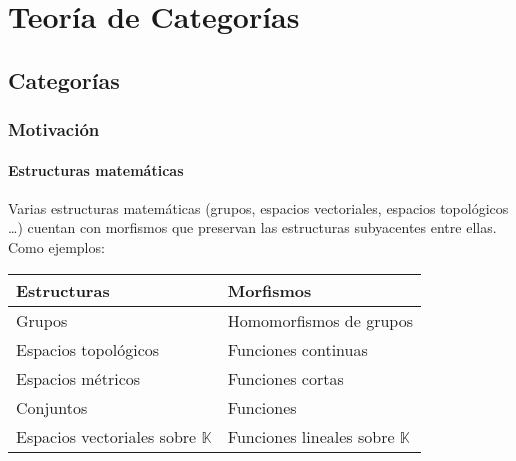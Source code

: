 \documentclass[11pt, fleqn, spanish]{book}
\begin{document}

\pagestyle{empty} %
\tableofcontents %
\cleardoublepage %
\pagestyle{fancy} %


\part{Teoría de Categorías}



\chapter{Categorías}

\section{Motivación}

\subsection{Estructuras matemáticas}
Varias estructuras matemáticas (grupos, espacios vectoriales, espacios
topológicos \dots) cuentan con morfismos que preservan las estructuras
subyacentes entre ellas. Como ejemplos:

\begin{center}
  \begin{tabular}{l|l}
    Estructuras & Morfismos \\
    \hline
    Grupos & Homomorfismos de grupos \\
    Espacios topológicos & Funciones continuas \\
    Espacios métricos & Funciones cortas \\
    Conjuntos & Funciones \\
    Espacios vectoriales sobre $\mathbb{K}$ & Funciones lineales sobre $\mathbb{K}$ \\
  \end{tabular}
\end{center}
\end{document}
